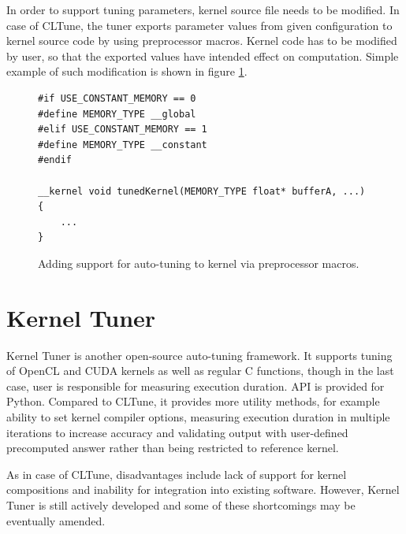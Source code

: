 \documentclass
[
    digital, %
    oneside, %
    table, %
    nolof, %
    nolot, %
    nocover %
]{fithesis3}
\begin{document}
In order to support tuning parameters, kernel source file needs to be modified. In case of CLTune, the tuner exports parameter values from given
configuration to kernel source code by using preprocessor macros. Kernel code has to be modified by user, so that the exported values have intended
effect on computation. Simple example of such modification is shown in figure \ref{cltune-example-kernel}.
\begin{figure}
\begin{lstlisting}
#if USE_CONSTANT_MEMORY == 0
#define MEMORY_TYPE __global
#elif USE_CONSTANT_MEMORY == 1
#define MEMORY_TYPE __constant
#endif

__kernel void tunedKernel(MEMORY_TYPE float* bufferA, ...)
{
    ...
}
\end{lstlisting}
\caption{Adding support for auto-tuning to kernel via preprocessor macros.}
\label{cltune-example-kernel}
\end{figure}

\section{Kernel Tuner}
Kernel Tuner \cite{kerneltuner} is another open-source auto-tuning framework. It supports tuning of OpenCL and CUDA kernels as well as regular C functions,
though in the last case, user is responsible for measuring execution duration. API is provided for Python. Compared to CLTune, it provides more utility
methods, for example ability to set kernel compiler options, measuring execution duration in multiple iterations to increase accuracy and validating output
with user-defined precomputed answer rather than being restricted to reference kernel.

As in case of CLTune, disadvantages include lack of support for kernel compositions and inability for integration into existing software. However,
Kernel Tuner is still actively developed and some of these shortcomings may be eventually amended.
\end{document}
